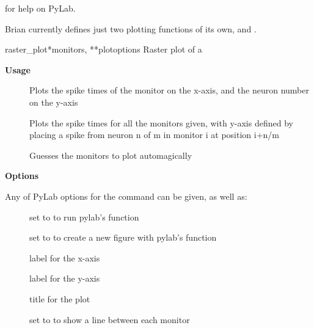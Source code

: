 \documentclass[letterpaper,10pt,english]{manual}
\begin{document}
for help on PyLab.

Brian currently defines just two plotting functions of its own,
\hyperlink{brian.raster_plot}{} and \hyperlink{brian.hist_plot}{}.

\hypertarget{brian.raster_plot}{}\begin{funcdesc}{raster\_plot}{*monitors, **plotoptions}
Raster plot of a \hyperlink{brian.SpikeMonitor}{}

\textbf{Usage}
\begin{description}
\item[] \leavevmode
Plots the spike times of the monitor
on the x-axis, and the neuron number on the y-axis

\item[] \leavevmode
Plots the spike times
for all the monitors given, with y-axis defined by placing a spike
from neuron n of m in monitor i at position i+n/m

\item[] \leavevmode
Guesses the monitors to plot automagically

\end{description}

\textbf{Options}

Any of PyLab options for the  command can be given, as well as:
\begin{description}
\item[] \leavevmode
set to  to run pylab's  function

\item[] \leavevmode
set to  to create a new figure with pylab's  function

\item[] \leavevmode
label for the x-axis

\item[] \leavevmode
label for the y-axis

\item[] \leavevmode
title for the plot

\item[] \leavevmode
set to  to show a line between each monitor


\end{description}
\end{funcdesc}
\end{document}
